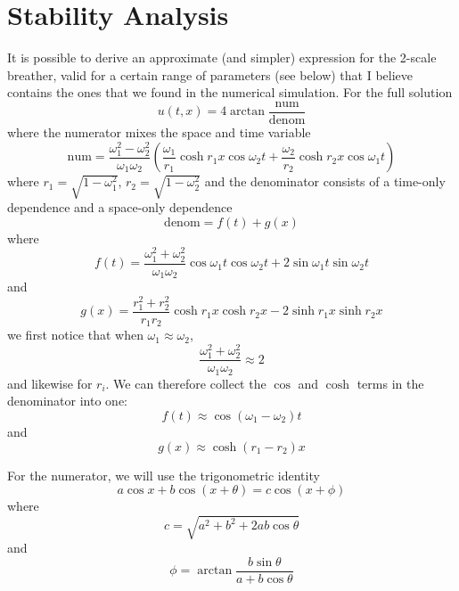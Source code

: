\documentclass{report}
\begin{document}
\chapter{Stability Analysis}
It is possible to derive an approximate (and simpler) expression for the 2-scale breather, valid for a certain range of parameters (see below) that I believe contains the ones that we found in the numerical simulation. For the full solution
\begin{equation}
  u(t,x)=4 \arctan \frac{\textrm{num}}{\textrm{denom}}
\end{equation}
where the numerator mixes the space and time variable
\begin{equation}
  \textrm{num} = \frac{\omega_1^2-\omega_2^2}{\omega_1 \omega_2} \left(\frac{\omega_1}{r_1} \cosh r_1 x \cos\omega_2 t + \frac{\omega_2}{r_2} \cosh r_2 x \cos\omega_1 t \right)
\end{equation}
where $r_1=\sqrt{1-\omega_1^2}$, $r_2=\sqrt{1-\omega_2^2}$ and the denominator consists of a time-only dependence and a space-only dependence
\begin{equation}
    \textrm{denom} = f(t) + g(x)
\end{equation}
where
\begin{equation}
  f(t) = \frac{\omega_1^2+\omega_2^2}{\omega_1 \omega_2} \cos \omega_1 t \cos \omega_2 t +2 \sin \omega_1 t \sin \omega_2 t
\end{equation}
and
\begin{equation}
  g(x) = \frac{r_1^2+r_2^2}{r_1 r_2} \cosh r_1 x \cosh r_2 x-2  \sinh r_1 x \sinh r_2 x
\end{equation}
we first notice that when $\omega_1\approx\omega_2$,
\begin{equation}
  \frac{\omega_1^2+\omega_2^2}{\omega_1 \omega_2} \approx 2
\end{equation}
and likewise for $r_i$. We can therefore collect the $\cos$ and $\cosh$ terms in the denominator into one:
\begin{equation}
  f(t) \approx \cos (\omega_1-\omega_2) t
\end{equation}
and
\begin{equation}
  g(x) \approx \cosh (r_1-r_2) x
\end{equation}

For the numerator, we will use the trigonometric identity
\begin{equation}
  a\cos x + b \cos(x+\theta) = c \cos(x+\phi)
\end{equation}
where
\begin{equation}
  c = \sqrt{a^2+b^2+2ab\cos\theta}
\end{equation}
and
\begin{equation}
  \phi=\arctan \frac{b\sin\theta}{a+b\cos\theta}
\end{equation}
\end{document}
